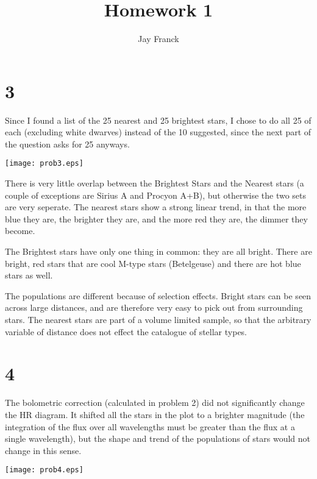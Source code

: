 \documentclass{article}
\begin{document}
\title{Homework 1}
\author{Jay Franck}
\maketitle

\section*{3}

Since I found a list of the 25 nearest and 25 brightest stars, I chose to do all 25 of each (excluding white dwarves) instead of the 10 suggested, since the next part of the question asks for 25 anyways.

\texttt{[image: prob3.eps]} 

There is very little overlap between the Brightest Stars and the Nearest stars (a couple of exceptions are Sirius A and Procyon A+B), but otherwise the two sets are very seperate. The nearest stars show a strong linear trend, in that the more blue they are, the brighter they are, and the more red they are, the dimmer they become.

The Brightest stars have only one thing in common: they are all bright. There are bright, red stars that are cool M-type stars (Betelgeuse) and there are hot blue stars as well.

The populations are different because of selection effects. Bright stars can be seen across large distances, and are therefore very easy to pick out from surrounding stars. The nearest stars are part of a volume limited sample, so that the arbitrary variable of distance does not effect the catalogue of stellar types.

\section*{4}


The bolometric correction (calculated in problem 2) did not significantly change the HR diagram. It  shifted all the stars in the plot to a brighter magnitude (the integration of the flux over all wavelengths must be greater than the flux at a single wavelength), but the shape and trend of the populations of stars would not change in this sense.


\texttt{[image: prob4.eps]} 
\end{document}
